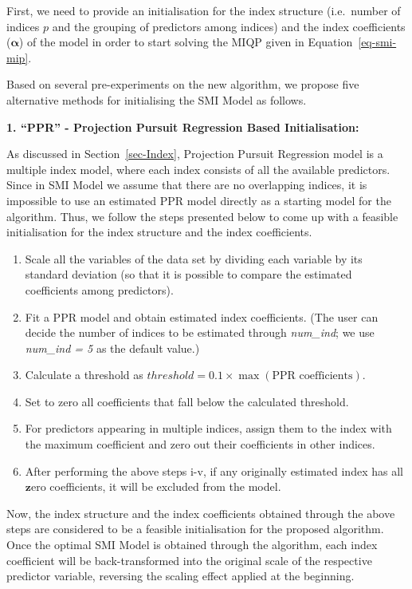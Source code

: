\documentclass[
  11pt,
  a4paper,
]{article}
\providecommand{\tightlist}{%
  \setlength{\itemsep}{0pt}\setlength{\parskip}{0pt}}\usepackage{longtable,booktabs,array}
\begin{document}
First, we need to provide an initialisation for the index structure
(i.e.~number of indices \(p\) and the grouping of predictors among
indices) and the index coefficients (\(\bm{\alpha}\)) of the model in
order to start solving the MIQP given in Equation~\ref{eq-smi-mip}.

Based on several pre-experiments on the new algorithm, we propose five
alternative methods for initialising the SMI Model as follows.

\textbf{1. ``PPR'' - Projection Pursuit Regression Based
Initialisation:}

As discussed in Section~\ref{sec-Index}, Projection Pursuit Regression
model is a multiple index model, where each index consists of all the
available predictors. Since in SMI Model we assume that there are no
overlapping indices, it is impossible to use an estimated PPR model
directly as a starting model for the algorithm. Thus, we follow the
steps presented below to come up with a feasible initialisation for the
index structure and the index coefficients.

\begin{enumerate}
\def\labelenumi{\alph{enumi}.}
\tightlist
\item
  Scale all the variables of the data set by dividing each variable by
  its standard deviation (so that it is possible to compare the
  estimated coefficients among predictors).
\item
  Fit a PPR model and obtain estimated index coefficients. (The user can
  decide the number of indices to be estimated through \emph{num\_ind};
  we use \emph{num\_ind = 5} as the default value.)
\item
  Calculate a threshold as
  \(threshold = 0.1 \times \max(\text{PPR coefficients})\).
\item
  Set to zero all coefficients that fall below the calculated threshold.
\item
  For predictors appearing in multiple indices, assign them to the index
  with the maximum coefficient and zero out their coefficients in other
  indices.
\item
  After performing the above steps i-v, if any originally estimated
  index has all \(\bm{z}\)ero coefficients, it will be excluded from the
  model.
\end{enumerate}

Now, the index structure and the index coefficients obtained through the
above steps are considered to be a feasible initialisation for the
proposed algorithm. Once the optimal SMI Model is obtained through the
algorithm, each index coefficient will be back-transformed into the
original scale of the respective predictor variable, reversing the
scaling effect applied at the beginning.
\end{document}
